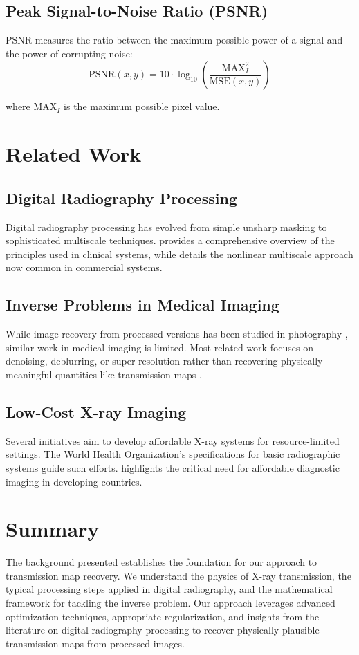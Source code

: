 \documentclass[nomenclature, english, bibtex]{kththesis}
\numberwithin{listing}{chapter}
\begin{document}
\subsection{Peak Signal-to-Noise Ratio (PSNR)}
PSNR measures the ratio between the maximum possible power of a signal and the power of corrupting noise:
\begin{equation}
\text{PSNR}(x, y) = 10 \cdot \log_{10}\left(\frac{\text{MAX}_I^2}{\text{MSE}(x, y)}\right)
\end{equation}

where $\text{MAX}_I$ is the maximum possible pixel value.

\section{Related Work}
\subsection{Digital Radiography Processing}
Digital radiography processing has evolved from simple unsharp masking to sophisticated multiscale techniques. \cite{prokop2003principles} provides a comprehensive overview of the principles used in clinical systems, while \cite{stahl2000digital} details the nonlinear multiscale approach now common in commercial systems.

\subsection{Inverse Problems in Medical Imaging}
While image recovery from processed versions has been studied in photography \cite{moran2020deeptone}, similar work in medical imaging is limited. Most related work focuses on denoising, deblurring, or super-resolution rather than recovering physically meaningful quantities like transmission maps \cite{jin2017deep}.

\subsection{Low-Cost X-ray Imaging}
Several initiatives aim to develop affordable X-ray systems for resource-limited settings. The World Health Organization's specifications for basic radiographic systems \cite{who2014specifications} guide such efforts. \cite{mollura2010radiology} highlights the critical need for affordable diagnostic imaging in developing countries.

\section{Summary}
The background presented establishes the foundation for our approach to transmission map recovery. We understand the physics of X-ray transmission, the typical processing steps applied in digital radiography, and the mathematical framework for tackling the inverse problem. Our approach leverages advanced optimization techniques, appropriate regularization, and insights from the literature on digital radiography processing to recover physically plausible transmission maps from processed images.
\end{document}
